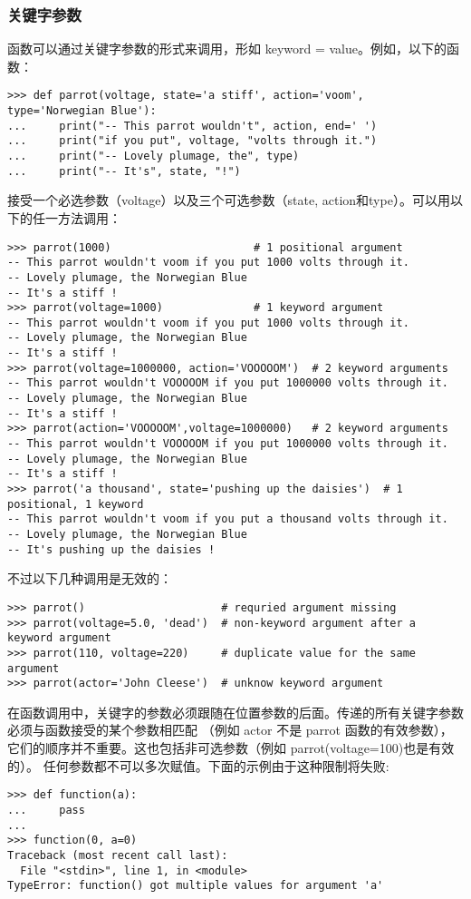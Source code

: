 \documentclass[UTF8]{ctexart}
\begin{document}
\subsubsection{关键字参数}
函数可以通过关键字参数的形式来调用，形如 keyword = value。例如，以下的函数：
\begin{verbatim}
>>> def parrot(voltage, state='a stiff', action='voom', type='Norwegian Blue'):
...     print("-- This parrot wouldn't", action, end=' ')
...     print("if you put", voltage, "volts through it.")
...     print("-- Lovely plumage, the", type)
...     print("-- It's", state, "!")
\end{verbatim}

接受一个必选参数（voltage）以及三个可选参数（state, action和type）。可以用以下的任一方法调用：
\begin{verbatim}
>>> parrot(1000)                      # 1 positional argument
-- This parrot wouldn't voom if you put 1000 volts through it.
-- Lovely plumage, the Norwegian Blue
-- It's a stiff !
>>> parrot(voltage=1000)              # 1 keyword argument
-- This parrot wouldn't voom if you put 1000 volts through it.
-- Lovely plumage, the Norwegian Blue
-- It's a stiff !
>>> parrot(voltage=1000000, action='VOOOOOM')  # 2 keyword arguments
-- This parrot wouldn't VOOOOOM if you put 1000000 volts through it.
-- Lovely plumage, the Norwegian Blue
-- It's a stiff !
>>> parrot(action='VOOOOOM',voltage=1000000)   # 2 keyword arguments
-- This parrot wouldn't VOOOOOM if you put 1000000 volts through it.
-- Lovely plumage, the Norwegian Blue
-- It's a stiff !
>>> parrot('a thousand', state='pushing up the daisies')  # 1 positional, 1 keyword
-- This parrot wouldn't voom if you put a thousand volts through it.
-- Lovely plumage, the Norwegian Blue
-- It's pushing up the daisies !
\end{verbatim}

不过以下几种调用是无效的：
\begin{verbatim}
>>> parrot()                     # requried argument missing
>>> parrot(voltage=5.0, 'dead')  # non-keyword argument after a keyword argument
>>> parrot(110, voltage=220)     # duplicate value for the same argument
>>> parrot(actor='John Cleese')  # unknow keyword argument
\end{verbatim}

在函数调用中，关键字的参数必须跟随在位置参数的后面。传递的所有关键字参数必须与函数接受的某个参数相匹配
（例如 actor 不是 parrot 函数的有效参数），它们的顺序并不重要。这也包括非可选参数（例如 parrot(voltage=100)也是有效的）。
任何参数都不可以多次赋值。下面的示例由于这种限制将失败:
\begin{verbatim}
>>> def function(a):
...     pass
...
>>> function(0, a=0)
Traceback (most recent call last):
  File "<stdin>", line 1, in <module>
TypeError: function() got multiple values for argument 'a'
\end{verbatim}
\end{document}

